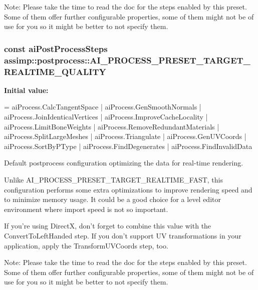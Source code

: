 Note\+: Please take the time to read the doc for the steps enabled by this preset. Some of them offer further configurable properties, some of them might not be of use for you so it might be better to not specify them. \hypertarget{namespaceassimp_1_1postprocess_acc49259290e35890a2f5c58ffdc0b8fd}{
\subsubsection[{A\+I\+\_\+\+P\+R\+O\+C\+E\+S\+S\+\_\+\+P\+R\+E\+S\+E\+T\+\_\+\+T\+A\+R\+G\+E\+T\+\_\+\+R\+E\+A\+L\+T\+I\+M\+E\+\_\+\+Q\+U\+A\+L\+I\+T\+Y}]{\setlength{\rightskip}{0pt plus 5cm}const {\bf ai\+Post\+Process\+Steps} assimp\+::postprocess\+::\+A\+I\+\_\+\+P\+R\+O\+C\+E\+S\+S\+\_\+\+P\+R\+E\+S\+E\+T\+\_\+\+T\+A\+R\+G\+E\+T\+\_\+\+R\+E\+A\+L\+T\+I\+M\+E\+\_\+\+Q\+U\+A\+L\+I\+T\+Y}}\label{namespaceassimp_1_1postprocess_acc49259290e35890a2f5c58ffdc0b8fd}
{\bfseries Initial value\+:}
\begin{DoxyCode}
=
      aiProcess.CalcTangentSpace |
      aiProcess.GenSmoothNormals |
      aiProcess.JoinIdenticalVertices |
      aiProcess.ImproveCacheLocality |
      aiProcess.LimitBoneWeights |
      aiProcess.RemoveRedundantMaterials |
      aiProcess.SplitLargeMeshes |
      aiProcess.Triangulate |
      aiProcess.GenUVCoords |
      aiProcess.SortByPType |
      aiProcess.FindDegenerates |
      aiProcess.FindInvalidData
\end{DoxyCode}
Default postprocess configuration optimizing the data for real-\/time rendering.

Unlike {\ttfamily A\+I\+\_\+\+P\+R\+O\+C\+E\+S\+S\+\_\+\+P\+R\+E\+S\+E\+T\+\_\+\+T\+A\+R\+G\+E\+T\+\_\+\+R\+E\+A\+L\+T\+I\+M\+E\+\_\+\+F\+A\+S\+T}, this configuration performs some extra optimizations to improve rendering speed and to minimize memory usage. It could be a good choice for a level editor environment where import speed is not so important.

If you're using Direct\+X, don't forget to combine this value with the {\ttfamily Convert\+To\+Left\+Handed} step. If you don't support U\+V transformations in your application, apply the {\ttfamily Transform\+U\+V\+Coords} step, too.

Note\+: Please take the time to read the doc for the steps enabled by this preset. Some of them offer further configurable properties, some of them might not be of use for you so it might be better to not specify them. 
